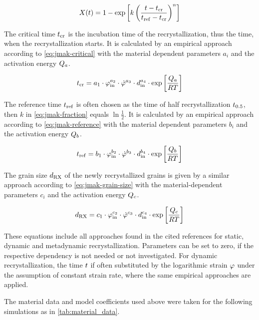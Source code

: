 \begin{equation}
    X(t) = 1 - \exp \left[ k \left( \frac{t - t_{\mathrm{cr}}}{t_{\mathrm{ref}} - t_{\mathrm{cr}}} \right)^n \right]
    \label{eq:jmak-fraction}
\end{equation}

The critical time $t_{\mathrm{cr}}$ is the incubation time of the recrystallization, thus the time, when the recrystallization starts.
It is calculated by an empirical approach according to \autoref{eq:jmak-critical} with the material dependent parameters $a_i$ and the activation energy $Q_a$.

\begin{equation}
    t_{\mathrm{cr}} = a_1 \cdot \varphi_{\mathrm{in}}^{a_2} \cdot \dot{\varphi}^{a_3} \cdot d_{\mathrm{in}}^{a_4} \cdot \exp \left[ \frac{Q_a}{R T} \right]
    \label{eq:jmak-critical}
\end{equation}

The reference time $t_{\mathrm{ref}}$ is often chosen as the time of half recrystallization $t_{0.5}$, then $k$ in \autoref{eq:jmak-fraction} equals $\ln \frac12$.
It is calculated by an empirical approach according to \autoref{eq:jmak-reference} with the material dependent parameters $b_i$ and the activation energy $Q_b$.

\begin{equation}
    t_{\mathrm{ref}} = b_1 \cdot \varphi_{\mathrm{in}}^{b_2} \cdot \dot{\varphi}^{b_3} \cdot d_{\mathrm{in}}^{b_4} \cdot \exp \left[ \frac{Q_b}{R T} \right]
    \label{eq:jmak-reference}
\end{equation}

The grain size $d_{\mathrm{RX}}$ of the newly recrystallized grains is given by a similar approach according to \autoref{eq:jmak-grain-size} with the material-dependent parameters $c_i$ and the activation energy $Q_c$.

\begin{equation}
    d_{\mathrm{RX}} = c_1 \cdot \varphi_{\mathrm{in}}^{c_2} \cdot \dot{\varphi}^{c_3} \cdot d_{\mathrm{in}}^{c_4} \cdot \exp \left[ \frac{Q_c}{R T} \right]
    \label{eq:jmak-grain-size}
\end{equation}

These equations include all approaches found in the cited references for static, dynamic and metadynamic recrystallization.
Parameters can be set to zero, if the respective dependency is not needed or not investigated.
For dynamic recrystallization, the time $t$ if often substituted by the logarithmic strain $\varphi$ under the assumption of constant strain rate, where the same empirical approaches are applied.

The material data and model coefficients used above were taken for the following simulations as in \autoref{tab:material_data}.

\begin{table}
    \centering
    \caption{Material Data and Model Coefficients Used in the Simulations}
    \label{tab:material_data}
    
\end{table}
